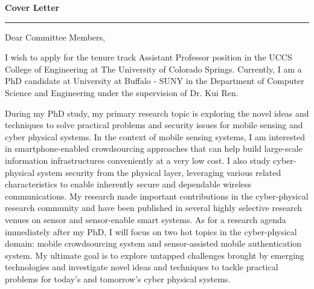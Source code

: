 \documentclass[11pt]{letter} %
\begin{document}

\begin{letter}{} 



\begin{center}
\Large\bf Cover Letter %
\vspace{20pt} \hrule height 1pt %
\end{center} 

\signature{Si Chen\\
Department of Computer Science and Engineering\\
University at Buffalo - SUNY\\
301 Davis Hall, Buffalo NY\\
(716) 335-8052} %


\opening{Dear Committee Members,} 
 
I wish to apply for the tenure track Assistant Professor position in the UCCS College of Engineering at The University of Colorado Springs. Currently, I am a PhD candidate at University at Buffalo - SUNY in the Department of Computer Science and Engineering under the supervision of Dr. Kui Ren. 

During my PhD study, my primary research topic is exploring the novel ideas and techniques to solve practical problems and security issues for mobile sensing and cyber physical systems. In the context of mobile sensing systems, I am interested in smartphone-enabled crowdsourcing approaches that can help build large-scale information infrastructures conveniently at a very low cost. I also study cyber-physical system security from the physical layer, leveraging various related characteristics to enable inherently secure and dependable wireless communications. My research made important contributions in the cyber-physical research community and have been published in several highly selective research venues on sensor and sensor-enable smart systems. As for a research agenda immediately after my PhD, I will focus on two hot topics in the cyber-physical domain: mobile crowdsourcing system and sensor-assisted mobile authentication system. My ultimate goal is to explore untapped challenges brought by emerging technologies and investigate novel ideas and techniques to tackle practical problems for today's and tomorrow's cyber physical systems.


\end{letter}
\end{document}
